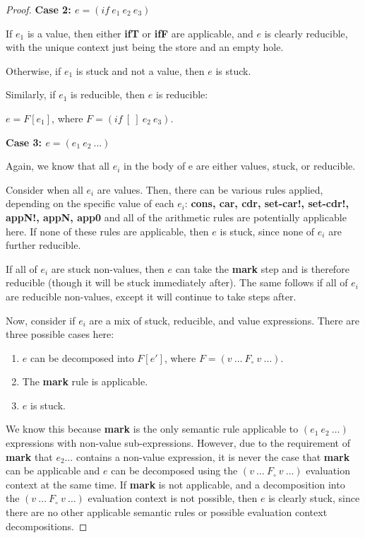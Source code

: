 \begin{proof}
\textbf{Case 2: $e = (if\ e_1\ e_2\ e_3)$}

If $e_1$ is a value, then either \textbf{ifT} or \textbf{ifF} are applicable, and $e$ is clearly reducible, with the unique context just being the store and an empty hole.

Otherwise, if $e_1$ is stuck and not a value, then $e$ is stuck. 

Similarly, if $e_1$ is reducible, then $e$ is reducible:

$e = F[e_1]$, where $F = (if\ [\ ]\ e_2\ e_3)$.

\textbf{Case 3: $e = (e_1\ e_2\ \dots)$}

Again, we know that all $e_i$ in the body of e are either values, stuck, or reducible.

Consider when all $e_i$ are values. Then, there can be various rules applied, depending on the specific value of each $e_i$: \textbf{cons, car, cdr, set-car!, set-cdr!, appN!, appN, app0} and all of the arithmetic rules are potentially applicable here. If none of these rules are applicable, then $e$ is stuck, since none of $e_i$ are further reducible.

If all of $e_i$ are stuck non-values, then $e$ can take the \textbf{mark} step and is therefore reducible (though it will be stuck immediately after). The same follows if all of $e_i$ are reducible non-values, except it will continue to take steps after.

Now, consider if $e_i$ are a mix of stuck, reducible, and value expressions. There are three possible cases here:

\begin{enumerate}
    \item $e$ can be decomposed into $F[e']$, where $F = (v\ \dots\ F_{\circ}\ v\ \dots)$.
    \item The \textbf{mark} rule is applicable.
    \item $e$ is stuck.
\end{enumerate}

We know this because \textbf{mark} is the only semantic rule applicable to $(e_1\ e_2\ \dots)$ expressions with non-value sub-expressions. However, due to the requirement of \textbf{mark} that $e_2\dots$ contains a non-value expression, it is never the case that \textbf{mark} can be applicable and $e$ can be decomposed using the $(v\ \dots\ F_{\circ}\ v\ \dots)$ evaluation context at the same time. If \textbf{mark} is not applicable, and a decomposition into the $(v\ \dots\ F_{\circ}\ v\ \dots)$ evaluation context is not possible, then $e$ is clearly stuck, since there are no other applicable semantic rules or possible evaluation context decompositions.


\end{proof}
